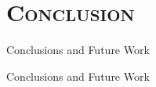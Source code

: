 \documentclass[xcolor=x11names,compress]{beamer}
\begin{document}
\section{\scshape Conclusion}

{
\begin{frame}[t]{Conclusions and Future Work}
    
\end{frame}}

{
\begin{frame}[t]{Conclusions and Future Work}
    
    
\end{frame}}
\end{document}
